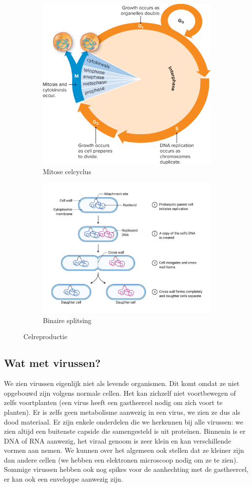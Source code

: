 \documentclass[a4paper,kul]{kulakarticle} %
\begin{document}
\begin{figure}[h]
	\centering
	\begin{subfigure}{.5\textwidth}
		\centering
		\includegraphics[width=0.7\linewidth]{Celcyclus}
		\caption{Mitose celcyclus}
		\label{fig:celcyclus}
	\end{subfigure}%
	\begin{subfigure}{.5\textwidth}
		\centering
		\includegraphics[width=0.7\linewidth]{Binaire_Splitsing}
		\caption[Splitsing]{Binaire splitsing}
		\label{fig:binairesplitsing}
	\end{subfigure}
	\caption{Celreproductie}
	\label{fig:reproductie}
\end{figure}

\subsection{Wat met virussen?}
We zien virussen eigenlijk niet als levende organismen. Dit komt omdat ze niet opgebouwd zijn volgens normale cellen. Het kan zichzelf niet voortbewegen of zelfs voortplanten (een virus heeft een gastheercel nodig om zich voort te planten). Er is zelfs geen metabolisme aanwezig in een virus, we zien ze dus als dood materiaal. Er zijn enkele onderdelen die we herkennen bij alle virussen: we zien altijd een buitenste capside die samengesteld is uit proteïnen. Binnenin is er DNA of RNA aanwezig, het viraal genoom is zeer klein en kan verschillende vormen aan nemen. We kunnen over het algemeen ook stellen dat ze kleiner zijn dan andere cellen (we hebben een elektronen microscoop nodig om ze te zien). Sommige virussen hebben ook nog spikes voor de aanhechting met de gastheercel, er kan ook een enveloppe aanwezig zijn. 
\newpage
\end{document}
